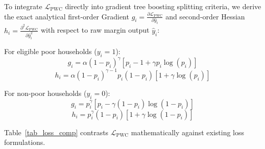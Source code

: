 \documentclass[conference]{IEEEtran}
\begin{document}
To integrate $\mathcal{L}_{\text{PWC}}$ directly into gradient tree boosting splitting criteria, we derive the exact analytical first-order Gradient $g_i = \frac{\partial \mathcal{L}_{\text{PWC}}}{\partial \hat{y}_i}$ and second-order Hessian $h_i = \frac{\partial^2 \mathcal{L}_{\text{PWC}}}{\partial \hat{y}_i^2}$ with respect to raw margin output $\hat{y}_i$:

For eligible poor households ($y_i = 1$):
\begin{equation}
g_i = \alpha (1 - p_i)^\gamma \left[ p_i - 1 + \gamma p_i \log(p_i) \right]
\end{equation}
\begin{equation}
h_i = \alpha (1 - p_i)^{\gamma-1} p_i (1 - p_i) \left[ 1 + \gamma \log(p_i) \right]
\end{equation}

For non-poor households ($y_i = 0$):
\begin{equation}
g_i = p_i^\gamma \left[ p_i - \gamma (1 - p_i) \log(1 - p_i) \right]
\end{equation}
\begin{equation}
h_i = p_i^\gamma (1 - p_i) \left[ 1 + \gamma \log(1 - p_i) \right]
\end{equation}

Table~\ref{tab_loss_comp} contrasts $\mathcal{L}_{\text{PWC}}$ mathematically against existing loss formulations.

\begin{table}[htbp]
\caption{Mathematical Comparison of Loss Objectives}
\begin{center}
\label{tab_loss_comp}
\end{center}
\end{table}
\end{document}
